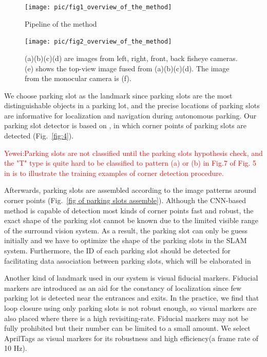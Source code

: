 \documentclass[journal]{IEEEtran}
\newcommand{\Reffig}[1]{Fig.~\ref{#1}}
\newcommand{\COMMENT}[1]{\textcolor{red}{#1}}
\begin{document}
\begin{figure}[htbp]
\centering
\texttt{[image: pic/fig1\_overview\_of\_the\_method]}
\caption{Pipeline of the method}\label{fig:1}
\end{figure}

\begin{figure}
\centering
\texttt{[image: pic/fig2\_overview\_of\_the\_method]}
\caption{
(a)(b)(c)(d) are images from left, right, front, back fisheye cameras. 
(e) shows the top-view image fused from (a)(b)(c)(d). The image from the monocular camera is (f). 
}\label{fig:2}
\end{figure}

%

We choose parking slot as the landmark since parking slots are the most distinguishable objects in a parking lot, and the precise locations of parking slots are informative for localization and navigation during autonomous parking.
Our parking slot detector is based on \citep{Li2017Vision}, in which corner points of parking slots are detected (\Reffig{fig:4}).

\COMMENT{Yewei:Parking slots are not classified until the parking slots hypothesis check, and the "T" type is quite hard to be classified to pattern (a) or (b) in Fig.7 of \citep{Li2017Vision}
Fig. 5 in \citep{Li2017Vision} is to illustrate the training examples of corner detection procedure.}

Afterwards, parking slots are assembled according to the image patterns around corner points (\Reffig{fig of parking slots assemble}).
Although the CNN-based method is capable of detection most kinds of corner points fast and robust, the exact shape of the parking slot cannot be known due to the limited visible range of the surround vision system.
As a result, the parking slot can only be guess initially and we have to optimize the shape of the parking slots in the SLAM system.
Furthermore, the ID of each parking slot should be detected for facilitating data association between parking slots, which will be elaborated in %

%

Another kind of landmark used in our system is visual fiducial markers.
Fiducial markers are introduced as an aid for the constancy of localization since few parking lot is detected near the entrances and exits. 
In the practice, we find that loop closure using only parking slots is not robust enough, so visual markers are also placed where there is a high revisiting-rate.
Fiducial markers may not be fully prohibited but their number can be limited to a small amount. 
We select AprilTags as visual markers for its robustness and high efficiency(a frame rate of 10 Hz)\citep{Olson2011AprilTag}.
\end{document}
